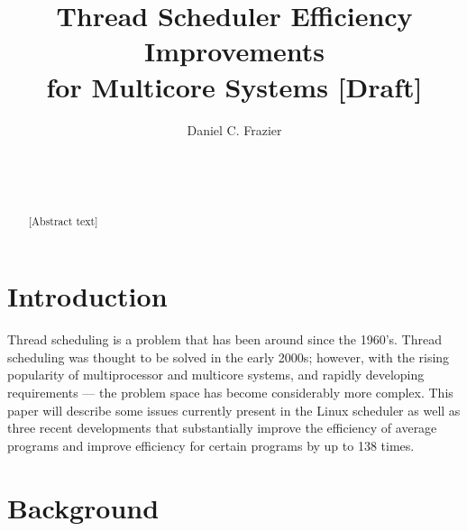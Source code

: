 \documentclass{sig-alternate}
\begin{document}

\title{Thread Scheduler Efficiency Improvements \\ for Multicore Systems [Draft]}


\author{
\alignauthor
Daniel C. Frazier\\
	\\
	\\
	\\
}
\maketitle


\begin{abstract}
[Abstract text]
\end{abstract}


\section{Introduction}
\label{sec:intro}

Thread scheduling is a problem that has been around since the 1960's. Thread scheduling was thought to be solved in the early 2000s; however, with the rising popularity of multiprocessor and multicore systems, and rapidly developing requirements --- the problem space has become considerably more complex. This paper will describe some issues currently present in the Linux scheduler as well as three recent developments that substantially improve the efficiency of average programs and improve efficiency for certain programs by up to 138 times.~\cite{Lozi:2016}

\section{Background}
\label{sec:bg}
\end{document}
